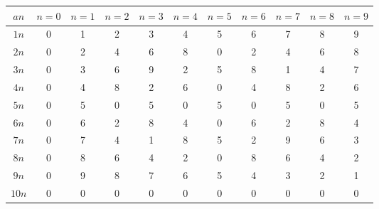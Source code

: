 \documentclass[12pt]{scrartcl}
\begin{document}
\begin{soaljawab}
\begin{solusi}
        \begin{tabular}{|c|cccccccccc|}
        \hline
        \textbf{$an$} & \textbf{$n=0$} & \textbf{$n=1$} & \textbf{$n=2$} & \textbf{$n=3$} & \textbf{$n=4$} & \textbf{$n=5$} & \textbf{$n=6$} & \textbf{$n=7$} & \textbf{$n=8$} & \textbf{$n=9$} \\
        \hline
        $1n$ & 0 & 1 & 2 & 3 & 4 & 5 & 6 & 7 & 8 & 9 \\
        $2n$ & 0 & 2 & 4 & 6 & 8 & 0 & 2 & 4 & 6 & 8 \\
        $3n$ & 0 & 3 & 6 & 9 & 2 & 5 & 8 & 1 & 4 & 7 \\
        $4n$ & 0 & 4 & 8 & 2 & 6 & 0 & 4 & 8 & 2 & 6 \\
        $5n$ & 0 & 5 & 0 & 5 & 0 & 5 & 0 & 5 & 0 & 5 \\
        $6n$ & 0 & 6 & 2 & 8 & 4 & 0 & 6 & 2 & 8 & 4 \\
        $7n$ & 0 & 7 & 4 & 1 & 8 & 5 & 2 & 9 & 6 & 3 \\
        $8n$ & 0 & 8 & 6 & 4 & 2 & 0 & 8 & 6 & 4 & 2 \\
        $9n$ & 0 & 9 & 8 & 7 & 6 & 5 & 4 & 3 & 2 & 1 \\
        $10n$ & 0 & 0 & 0 & 0 & 0 & 0 & 0 & 0 & 0 & 0 \\
        \hline
        \end{tabular}

    \end{solusi}
\end{soaljawab}
\end{document}
